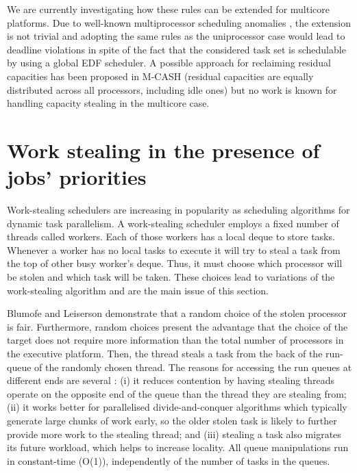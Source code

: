 \documentclass[10pt,twocolumn]{article}
\begin{document}
We are currently investigating how these rules can be extended for multicore platforms. Due to well-known multiprocessor scheduling anomalies \cite{andersson02}, the extension is not trivial and adopting the same rules as the uniprocessor case would lead to deadline violations in spite of the fact that the considered task set is schedulable by using a global EDF scheduler. A possible approach for reclaiming residual capacities has been proposed in M-CASH \cite{pellizzoni08} (residual capacities are equally distributed across all processors, including idle ones) but no work is known for handling capacity stealing in the multicore case. 

\section{Work stealing in the presence of jobs' priorities}

Work-stealing schedulers are increasing in popularity as scheduling algorithms for dynamic task parallelism. A work-stealing scheduler employs a fixed number of threads called workers. Each of those workers has a local deque to store tasks. Whenever a worker has no local tasks to execute it will try to steal a task from the top of other busy worker's deque. Thus, it must choose which processor will be stolen and which task will be taken. These choices lead to variations of the work-stealing algorithm and are the main issue of this section.

Blumofe and Leiserson \cite{blumofe99} demonstrate that a random choice of the stolen processor is fair. Furthermore, random choices present the advantage that the choice of the target does not require more information than the total number of processors in the executive platform. Then, the thread steals a task from the back of the run-queue of the randomly chosen thread. The reasons for accessing the run queues at different ends are several \cite{frigo98}: (i) it reduces contention by having stealing threads operate on the opposite end of the queue than the thread they are stealing from; (ii) it works better for parallelised divide-and-conquer algorithms which typically generate large chunks of work early, so the older stolen task is likely to further provide more work to the stealing thread; and (iii) stealing a task also migrates its future workload, which helps to increase locality. All queue manipulations run in constant-time (O(1)), independently of the number of tasks in the queues.
\end{document}
